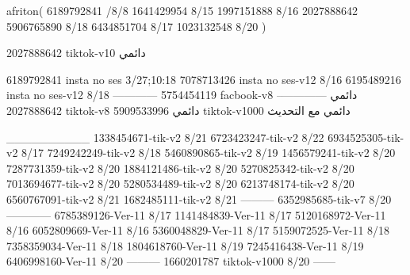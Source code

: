 afriton(
6189792841 /8/8
1641429954 8/15
1997151888 8/16
2027888642
5906765890 8/18
6434851704 8/17
1023132548 8/20
)

2027888642 tiktok-v10
دائمي

6189792841 insta no ses
3/27;10:18
7078713426 insta no ses-v12
8/16
6195489216 insta no ses-v12
8/18
------------
5754454119 facbook-v8
دائمي
--------------
2027888642 tiktok-v8
دائمي
5909533996 tiktok-v1000
دائمي مع التحديث

__________
1338454671-tik-v2
8/21
6723423247-tik-v2
8/22
6934525305-tik-v2
8/17
7249242249-tik-v2
8/18
5460890865-tik-v2
8/19
1456579241-tik-v2
8/20
7287731359-tik-v2
8/20
1884121486-tik-v2
8/20
5270825342-tik-v2
8/20
7013694677-tik-v2
8/20
5280534489-tik-v2
8/20
6213748174-tik-v2
8/20
6560767091-tik-v2
8/21
1682485111-tik-v2
8/21
---------
6352985685-tik-v7
8/20
------------
6785389126-Ver-11
8/17
1141484839-Ver-11
8/17
5120168972-Ver-11
8/16
6052809669-Ver-11
8/16
5360048829-Ver-11
8/17
5159072525-Ver-11
8/18
7358359034-Ver-11
8/18
1804618760-Ver-11
8/19
7245416438-Ver-11
8/19
6406998160-Ver-11
8/20
---------
1660201787 tiktok-v1000
8/20
------
